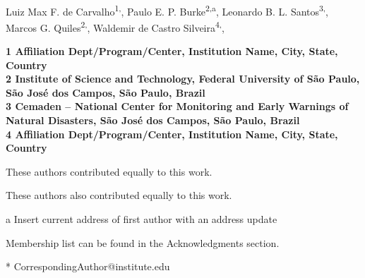 \documentclass[10pt,letterpaper]{article}
\date{}
\begin{document}
\vspace*{0.35in}

\begin{flushleft}
{\Large
\textbf{} %
}
\newline
\\
Luiz Max F. de Carvalho\textsuperscript{1,\Yinyang},
Paulo E. P. Burke\textsuperscript{2,\textcurrency a},
Leonardo B. L. Santos\textsuperscript{3,\ddag},
Marcos G. Quiles\textsuperscript{2,\ddag},
Waldemir de Castro Silveira\textsuperscript{4,\Yinyang},


\bigskip
\bf{1} Affiliation Dept/Program/Center, Institution Name, City, State, Country
\\
\bf{2} Institute of Science and Technology, Federal University of São Paulo, São José dos Campos, São Paulo, Brazil
\\
\bf{3} Cemaden -- National Center for Monitoring and Early Warnings of Natural Disasters, São José dos Campos, São Paulo, Brazil
\\
\bf{4} Affiliation Dept/Program/Center, Institution Name, City, State, Country
\\
\bigskip

% 
%
\Yinyang These authors contributed equally to this work.

\ddag These authors also contributed equally to this work.

\textcurrency a Insert current address of first author with an address update


\textpilcrow Membership list can be found in the Acknowledgments section.

* CorrespondingAuthor@institute.edu

\end{flushleft}
\end{document}
